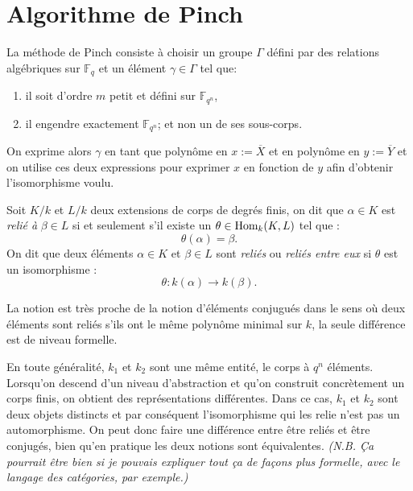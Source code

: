 \documentclass[a4paper]{article} %
\numberwithin{section}{part}
\numberwithin{equation}{section}
\newcommand\GF[1]{\mathbb{F}_{#1}}
\begin{document}
\section{Algorithme de Pinch}
\label{sec:algpinch}
La méthode de Pinch consiste à choisir un groupe $\Gamma$ défini par des 
relations algébriques sur $\GF{q}$ et un élément $\gamma\in\Gamma$ tel que:
\vspace{0.3cm}
\begin{enumerate}[1.]
\item il soit d'ordre $m$ petit et défini sur $\GF{q^n}$,
\item il engendre exactement $\GF{q^n}$; et non un de ses sous-corps.
\end{enumerate}
\vspace{0.3cm}
On exprime alors $\gamma$ en tant que polynôme en $x := \overline{X}$ et en 
polynôme en $y := \overline{Y}$ et on utilise ces deux expressions pour exprimer
$x$ en fonction de $y$ afin d'obtenir l'isomorphisme voulu.\par
\begin{defn}
    Soit $K/k$ et $L/k$ deux extensions de corps de degrés finis, on dit que 
    $\alpha\in K$ est \emph{relié à} $\beta\in L$ si et seulement s'il existe un
    $\theta\in\textup{Hom}_k(K, L)$ tel que :
    \begin{equation}
        \theta(\alpha) = \beta.
    \end{equation}
    On dit que deux éléments $\alpha\in K$ et $\beta\in L$ sont \emph{reliés}
    ou \emph{reliés entre eux} si $\theta$ est un isomorphisme :
    \begin{equation}
        \theta : k(\alpha)\to k(\beta).
    \end{equation}
\end{defn}
\begin{rem}
La notion est très proche de la notion d'éléments conjugués dans le sens où deux
éléments sont reliés s'ils ont le même polynôme minimal sur $k$, la 
seule différence est de niveau formelle.\par
En toute généralité, $k_1$ et $k_2$ sont une même entité, le corps à $q^n$ 
éléments. Lorsqu'on descend d'un niveau d'abstraction et qu'on construit
concrètement un corps finis, on obtient des représentations différentes. Dans
ce cas, $k_1$ et $k_2$ sont deux objets distincts et par conséquent 
l'isomorphisme qui les relie n'est pas un automorphisme. On peut donc
faire une différence entre être reliés et être conjugés, bien qu'en pratique les
deux notions sont équivalentes.
\textit{(\emph{N.B.} Ça pourrait être bien si je pouvais expliquer tout ça de
façons plus formelle, avec le langage des catégories, par exemple.)}
\end{rem}
\end{document}
